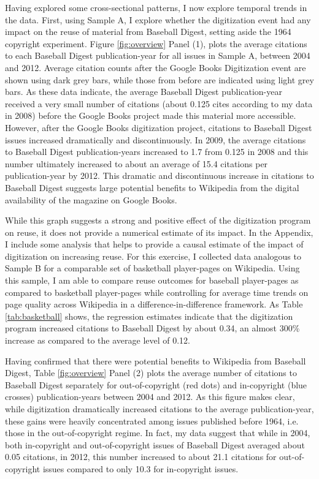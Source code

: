 \documentclass[11pt]{article}
\begin{document}
Having explored some cross-sectional patterns,  I now explore temporal trends in the data. First, using Sample A, I explore whether the digitization event had any impact on the reuse of material from Baseball Digest, setting aside the 1964 copyright experiment. Figure \ref{fig:overview} Panel (1), plots the average citations to each Baseball Digest publication-year for all issues in Sample A, between 2004 and 2012. Average citation counts after the Google Books Digitization event are shown using dark grey bars, while those from before are indicated using light grey bars. As these data indicate, the average Baseball Digest publication-year received a very small number of citations (about 0.125 cites according to my data in 2008) before the Google Books project made this material more accessible. However, after the Google Books digitization project, citations to Baseball Digest issues increased dramatically and discontinuously. In 2009, the average citations to Baseball Digest publication-years increased to 1.7 from 0.125 in 2008 and this number ultimately increased to about an average of 15.4 citations per publication-year by 2012. This dramatic and discontinuous increase in citations to Baseball Digest suggests large potential benefits to Wikipedia from the digital availability of the magazine on Google Books.

While this graph suggests a strong and positive effect of the digitization program on reuse, it does not provide a numerical estimate of its impact. In the Appendix, I include some analysis that helps to provide a causal estimate of the impact of digitization on increasing reuse. For this exercise, I collected data analogous to Sample B for a comparable set of basketball player-pages on Wikipedia. Using this sample, I am able to compare reuse outcomes for baseball player-pages as compared to basketball player-pages while controlling for average time trends on page quality across Wikipedia in a difference-in-difference framework. As Table \ref{tab:basketball} shows, the regression estimates indicate that the digitization program increased citations to Baseball Digest by about 0.34, an almost 300\% increase as compared to the average level of 0.12. 

Having confirmed that there were potential benefits to Wikipedia from Baseball Digest, Table \ref {fig:overview} Panel (2) plots the average number of citations to Baseball Digest separately for out-of-copyright (red dots) and in-copyright (blue crosses) publication-years between 2004 and 2012. As this figure makes clear, while digitization dramatically increased citations to the average publication-year, these gains were heavily concentrated among issues published before 1964, i.e. those in the out-of-copyright regime. In fact, my data suggest that while in 2004, both in-copyright and out-of-copyright issues of Baseball Digest averaged about 0.05 citations, in 2012, this number increased to about 21.1 citations for out-of-copyright issues compared to only 10.3 for in-copyright issues.
\end{document}
